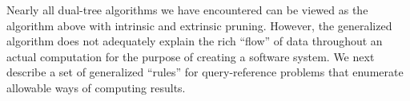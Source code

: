\documentclass[twoside,leqno,twocolumn]{article}
\begin{document}
Nearly all dual-tree algorithms we have encountered can be viewed as the algorithm above with intrinsic and extrinsic pruning.
However, the generalized algorithm does not adequately explain the rich ``flow'' of data throughout an actual computation for the purpose of creating a software system.
We next describe a set of generalized ``rules'' for query-reference problems that enumerate allowable ways of computing results.




\end{document}
